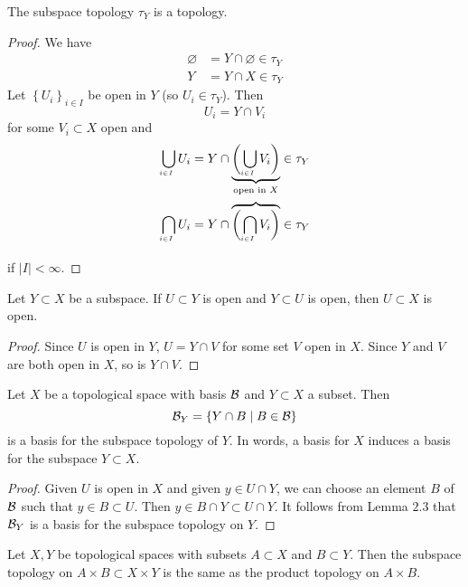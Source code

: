 \begin{customlemma}{2.7}
The subspace topology $\tau_Y$ is a topology.
\end{customlemma}
\begin{proof}
We have
\begin{align*}
    \varnothing &= Y \cap \varnothing \in \tau_Y\\
    Y & = Y \cap X \in \tau_Y
\end{align*}
Let $\left\{U_i\right\}_{i \in I}$ be open in $Y$ (so $U_i \in \tau_Y$). Then 
$$U_i = Y\cap V_i$$
for some $V_i \subset X$ open and 
\begin{align*}
  \underaccent{i\in I}{\bigcup} U_i &= Y \cap \underbrace{\left(\underaccent{i\in I}{\bigcup} V_i\right)}_{\text{open in $X$}} \in \tau_Y \\
  \underaccent{i\in I}{\bigcap} U_i &= Y \cap \overbrace{\left(\underaccent{i\in I}{\bigcap} V_i\right)}_{} \in \tau_Y
\end{align*}
if $|I| < \infty$.
\end{proof}

\begin{customlemma}{2.8}
Let $Y \subset X$ be a subspace. If $U \subset Y$ is open and $Y \subset U$ is open, then $U \subset X$ is open.
\end{customlemma}

\begin{proof}
Since $U$ is open in $Y$, $U = Y \cap V$ for some set $V$ open in $X$. Since $Y$ and $V$ are both open in $X$, so is $Y \cap V$.
\end{proof}

\begin{customlemma}{2.9}
Let $X$ be a topological space with basis $\mathcal{B}$ and $Y\subset X$ a subset. Then
$$\mathcal{B}_Y = \left\{Y\cap B \mid B \in \mathcal{B}\right\}$$
is a basis for the subspace topology of $Y$. In words, a basis for $X$ induces a basis for the subspace $Y \subset X$.
\end{customlemma}

\begin{proof}
Given $U$ is open in $X$ and given $y \in U \cap Y$, we can choose an element $B$ of $\mathcal{B}$ such that $y \in B \subset U$. Then $y \in B \cap Y \subset U \cap Y$. It follows from Lemma $2.3$ that $\mathcal{B}_Y$ is a basis for the subspace topology on $Y$.
\end{proof}

\begin{customthm}{2.10}
Let $X, Y$ be topological spaces with subsets $A\subset X$ and $B \subset Y$. Then the subspace topology on $A\times B \subset X \times Y$ is the same as the product topology on $A \times B$.
\end{customthm}


